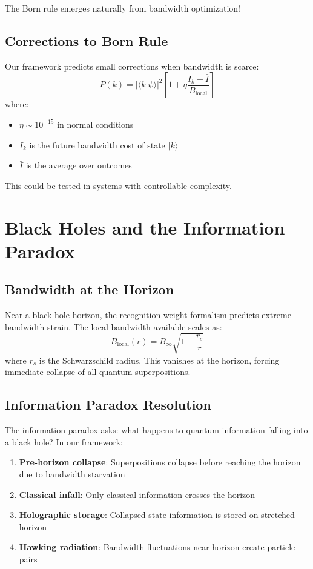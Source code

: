 \documentclass[twocolumn,prd,amsmath,amssymb,aps,superscriptaddress,nofootinbib]{revtex4-2}
\begin{document}
The Born rule emerges naturally from bandwidth optimization!

\subsection{Corrections to Born Rule}

Our framework predicts small corrections when bandwidth is scarce:
\begin{equation}
P(k) = |\langle k|\psi\rangle|^2 \left[1 + \eta\frac{I_k - \bar{I}}{B_{\text{local}}}\right]
\label{eq:born_corrections}
\end{equation}
where:
\begin{itemize}
\item $\eta \sim 10^{-15}$ in normal conditions
\item $I_k$ is the future bandwidth cost of state $|k\rangle$
\item $\bar{I}$ is the average over outcomes
\end{itemize}

This could be tested in systems with controllable complexity.

\section{Black Holes and the Information Paradox}
\label{sec:blackholes}

\subsection{Bandwidth at the Horizon}

Near a black hole horizon, the recognition-weight formalism predicts extreme bandwidth strain. The local bandwidth available scales as:
\begin{equation}
B_{\text{local}}(r) = B_\infty \sqrt{1 - \frac{r_s}{r}}
\label{eq:horizon_bandwidth}
\end{equation}
where $r_s$ is the Schwarzschild radius. This vanishes at the horizon, forcing immediate collapse of all quantum superpositions.

\subsection{Information Paradox Resolution}

The information paradox asks: what happens to quantum information falling into a black hole? In our framework:

\begin{enumerate}
\item \textbf{Pre-horizon collapse}: Superpositions collapse before reaching the horizon due to bandwidth starvation
\item \textbf{Classical infall}: Only classical information crosses the horizon
\item \textbf{Holographic storage}: Collapsed state information is stored on stretched horizon
\item \textbf{Hawking radiation}: Bandwidth fluctuations near horizon create particle pairs
\end{enumerate}
\end{document}
